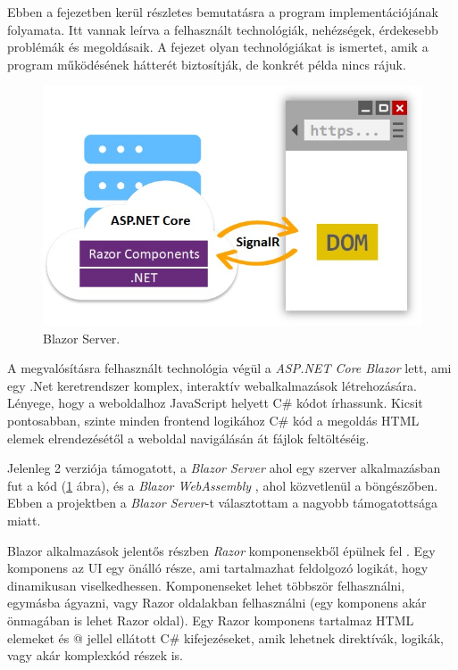 
Ebben a fejezetben kerül részletes bemutatásra a program implementációjának folyamata. Itt vannak leírva a felhasznált technológiák, nehézségek, érdekesebb problémák és megoldásaik. A fejezet olyan technológiákat is ismertet, amik a program működésének hátterét biztosítják, de konkrét példa nincs rájuk.

\begin{figure}[h]
\centering
\includegraphics[scale=0.5]{images/blazor.jpg}
\caption{Blazor Server. \cite{blazor}}
\label{fig:blazor}
\end{figure}

A megvalósításra felhasznált technológia végül a \textit{ASP.NET Core Blazor}  \cite{blazor} lett, ami egy .Net \cite{dotnet} keretrendszer komplex, interaktív webalkalmazások létrehozására. Lényege, hogy a weboldalhoz  JavaScript \cite{js} helyett C\# \cite{csharp} kódot írhassunk. Kicsit pontosabban, szinte minden frontend logikához C\# kód a megoldás HTML \cite{html} elemek elrendezésétől a weboldal navigálásán át fájlok feltöltéséig.

Jelenleg 2 verziója támogatott, a \textit{Blazor Server}  \cite{blazor_h} ahol egy szerver alkalmazásban fut a kód (\ref{fig:blazor} ábra), és a \textit{Blazor WebAssembly} \cite{blazor_h}, ahol közvetlenül a böngészőben. Ebben a projektben a \textit{Blazor Server}-t választottam a nagyobb támogatottsága miatt.

Blazor alkalmazások jelentős részben \textit{Razor} komponensekből épülnek fel \cite{razor}. Egy komponens az UI egy önálló része, ami tartalmazhat feldolgozó logikát, hogy dinamikusan viselkedhessen. Komponenseket lehet többször felhasználni, egymásba ágyazni, vagy Razor oldalakban felhasználni (egy komponens akár önmagában is lehet Razor oldal). Egy Razor komponens tartalmaz HTML elemeket és @ jellel ellátott C\# kifejezéseket, amik lehetnek direktívák, logikák, vagy akár komplexkód részek is.

